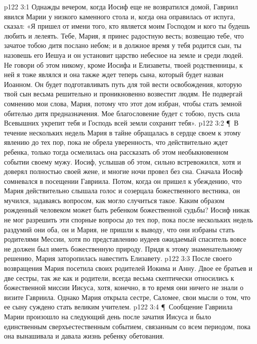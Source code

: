 \vs p122 3:1 Однажды вечером, когда Иосиф еще не возвратился домой, Гавриил явился Марии у низкого каменного стола и, когда она оправилась от испуга, сказал: «Я пришел от имени того, кто является моим Господом и кого ты будешь любить и лелеять. Тебе, Мария, я принес радостную весть; возвещаю тебе, что зачатое тобою дитя послано небом; и в должное время у тебя родится сын, ты назовешь его Иешуа и он установит царство небесное на земле и среди людей. Не говори об этом никому, кроме Иосифа и Елизаветы, твоей родственницы, к ней я тоже являлся и она также ждет теперь сына, который будет назван Иоанном. Он будет подготавливать путь для той вести освобождения, которую твой сын весьма решительно и проникновенно возвестит людям. Не подвергай сомнению мои слова, Мария, потому что этот дом избран, чтобы стать земной обителью дитя предназначения. Мое благословение будет с тобою, пусть сила Всевышних укрепит тебя и Господь всей земли сохранит тебя».
\vs p122 3:2 \P\ В течение нескольких недель Мария в тайне обращалась в сердце своем к этому явлению до тех пор, пока не обрела уверенность, что действительно ждет ребенка, только тогда осмелилась она рассказать об этом необыкновенном событии своему мужу. Иосиф, услышав об этом, сильно встревожился, хотя и доверял полностью своей жене, и многие ночи провел без сна. Сначала Иосиф сомневался в посещении Гавриила. Потом, когда он пришел к убеждению, что Мария действительно слышала голос и созерцала божественного вестника, он мучился, задаваясь вопросом, как могло случиться такое. Каким образом рожденный человеком может быть ребенком божественной судьбы? Иосиф никак не мог разрешить эти спорные вопросы до тех пор, пока после нескольких недель раздумий они оба, он и Мария, не пришли к выводу, что они избраны стать родителями Мессии, хотя по представлению иудеев ожидаемый спаситель вовсе не должен был иметь божественную природу. Придя к этому знаменательному решению, Мария заторопилась навестить Елизавету.
\vs p122 3:3 После своего возвращения Мария посетила своих родителей Иокима и Анну. Двое ее братьев и две сестры, так же как и родители, всегда весьма скептически относились к божественной миссии Иисуса, хотя, конечно, в то время они ничего не знали о визите Гавриила. Однако Мария открыла сестре, Саломее, свои мысли о том, что ее сыну суждено стать великим учителем.
\vs p122 3:4 \P\ Сообщение Гавриила Марии произошло на следующий день после зачатия Иисуса и было единственным сверхъестественным событием, связанным со всем периодом, пока она вынашивала и давала жизнь ребенку обетования.
